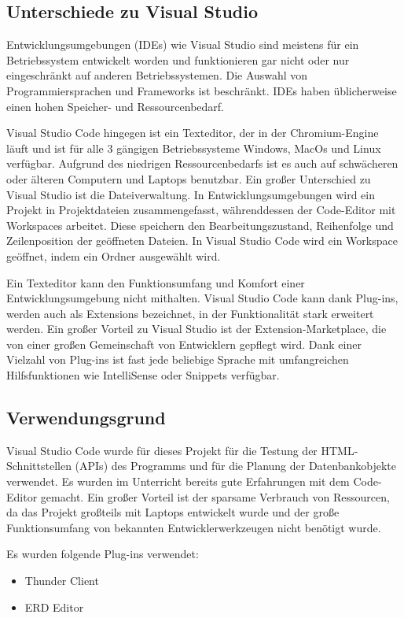 \subsection{Unterschiede zu Visual Studio}
Entwicklungsumgebungen (IDEs) wie Visual Studio sind meistens für ein Betriebssystem entwickelt worden und funktionieren 
gar nicht oder nur eingeschränkt auf anderen Betriebssystemen. Die Auswahl von Programmiersprachen und Frameworks ist beschränkt. IDEs 
haben üblicherweise einen hohen Speicher- und Ressourcenbedarf.

Visual Studio Code hingegen ist ein Texteditor, der in der Chromium-Engine läuft und ist für alle 3 gängigen Betriebssysteme 
Windows, MacOs und Linux verfügbar. Aufgrund des niedrigen Ressourcenbedarfs ist es auch auf schwächeren oder älteren Computern und Laptops benutzbar.
Ein großer Unterschied zu Visual Studio ist die Dateiverwaltung. 
In Entwicklungsumgebungen wird ein Projekt in Projektdateien zusammengefasst, 
währenddessen der Code-Editor mit Workspaces arbeitet. Diese speichern den 
Bearbeitungszustand, Reihenfolge und Zeilenposition der geöffneten Dateien. 
In Visual Studio Code wird ein Workspace geöffnet, indem ein Ordner ausgewählt wird.

Ein Texteditor kann den Funktionsumfang und Komfort einer Entwicklungsumgebung nicht mithalten. Visual Studio Code 
kann dank Plug-ins, werden auch als Extensions bezeichnet, in der Funktionalität stark erweitert werden.
Ein großer Vorteil zu Visual Studio ist der Extension-Marketplace, die von einer großen Gemeinschaft von Entwicklern gepflegt wird.
Dank einer Vielzahl von Plug-ins ist fast jede beliebige Sprache mit umfangreichen Hilfsfunktionen wie IntelliSense oder Snippets verfügbar.

\subsection{Verwendungsgrund}
Visual Studio Code wurde für dieses Projekt für die Testung der HTML-Schnittstellen (APIs) des Programms und für die Planung der Datenbankobjekte verwendet.
Es wurden im Unterricht bereits gute Erfahrungen mit dem Code-Editor gemacht. Ein großer Vorteil ist der sparsame Verbrauch von Ressourcen, 
da das Projekt großteils mit Laptops entwickelt wurde und der große Funktionsumfang von bekannten Entwicklerwerkzeugen nicht benötigt wurde.

Es wurden folgende Plug-ins verwendet:
\begin{itemize}
    \item Thunder Client
    \item ERD Editor
\end{itemize}

